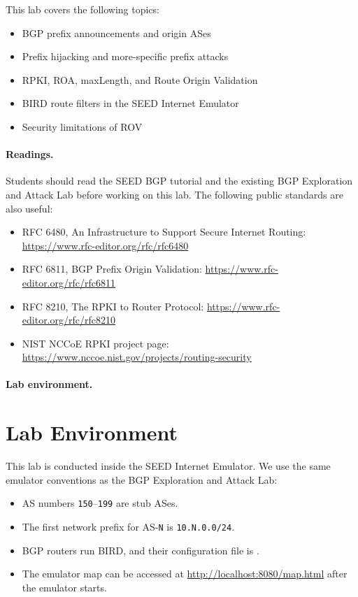 This lab covers the following topics:

\begin{itemize}[noitemsep]
\item BGP prefix announcements and origin ASes
\item Prefix hijacking and more-specific prefix attacks
\item RPKI, ROA, maxLength, and Route Origin Validation
\item BIRD route filters in the SEED Internet Emulator
\item Security limitations of ROV
\end{itemize}

\paragraph{Readings.}
Students should read the SEED BGP tutorial and the existing BGP Exploration and
Attack Lab before working on this lab. The following public standards are also
useful:

\begin{itemize}
\item RFC 6480, An Infrastructure to Support Secure Internet Routing:
      \url{https://www.rfc-editor.org/rfc/rfc6480}
\item RFC 6811, BGP Prefix Origin Validation:
      \url{https://www.rfc-editor.org/rfc/rfc6811}
\item RFC 8210, The RPKI to Router Protocol:
      \url{https://www.rfc-editor.org/rfc/rfc8210}
\item NIST NCCoE RPKI project page:
      \url{https://www.nccoe.nist.gov/projects/routing-security}
\end{itemize}

\paragraph{Lab environment.}
\seedenvironmentB
\nodependency


\section{Lab Environment}

This lab is conducted inside the SEED Internet Emulator. We use the same
emulator conventions as the BGP Exploration and Attack Lab:

\begin{itemize}[noitemsep]
\item AS numbers \texttt{150}--\texttt{199} are stub ASes.
\item The first network prefix for AS-\texttt{N} is \texttt{10.N.0.0/24}.
\item BGP routers run BIRD, and their configuration file is
      .
\item The emulator map can be accessed at \url{http://localhost:8080/map.html}
      after the emulator starts.
\end{itemize}

